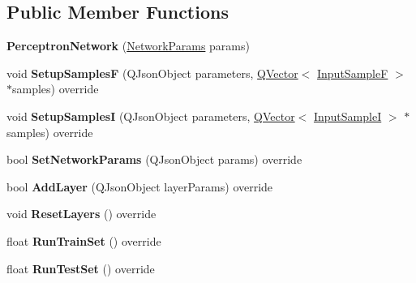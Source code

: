\subsection*{Public Member Functions}
\begin{DoxyCompactItemize}
\item 
\mbox{\label{class_perceptron_network_a05ac856c829795664393e9577f0f58b5}} 
{\bfseries Perceptron\+Network} (\hyperlink{struct_perceptron_1_1_network_params}{Network\+Params} params)
\item 
\mbox{\label{class_perceptron_network_a34139545d51a95537ecb46819deb348a}} 
void {\bfseries Setup\+SamplesF} (Q\+Json\+Object parameters, \hyperlink{class_q_vector}{Q\+Vector}$<$ \hyperlink{class_q_pair}{Input\+SampleF} $>$ $\ast$samples) override
\item 
\mbox{\label{class_perceptron_network_aced7b81e1fb2d69e050f62cabd058ec3}} 
void {\bfseries Setup\+SamplesI} (Q\+Json\+Object parameters, \hyperlink{class_q_vector}{Q\+Vector}$<$ \hyperlink{class_q_pair}{Input\+SampleI} $>$ $\ast$samples) override
\item 
\mbox{\label{class_perceptron_network_afb8e01ac4a933a35abf784d4c00a3f12}} 
bool {\bfseries Set\+Network\+Params} (Q\+Json\+Object params) override
\item 
\mbox{\label{class_perceptron_network_ad5b18f2f4d84fb9fa7941e133a4fb72e}} 
bool {\bfseries Add\+Layer} (Q\+Json\+Object layer\+Params) override
\item 
\mbox{\label{class_perceptron_network_a725149f0b03c8a6e07ea2a64c8c98556}} 
void {\bfseries Reset\+Layers} () override
\item 
\mbox{\label{class_perceptron_network_a17cdca41fc873b70bb700b10e32240eb}} 
float {\bfseries Run\+Train\+Set} () override
\item 
\mbox{\label{class_perceptron_network_a0f2c75a5cbac4485eef6a0ef942da407}} 
float {\bfseries Run\+Test\+Set} () override
\end{DoxyCompactItemize}
